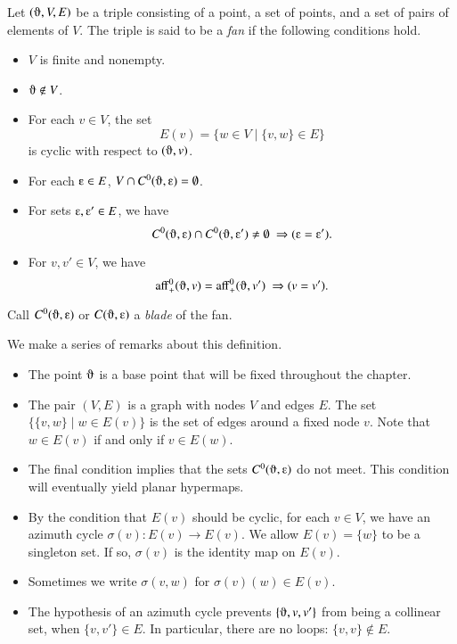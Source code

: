 \begin{definition}[fan]  Let $(\orgn,V,E)$ be a triple consisting of a point,
a set of
points, and a set of pairs of elements of $V$.  The triple is said to be
a {\it fan\/} if the following conditions hold.
    \begin{itemize}
    \item $V$ is finite and nonempty.
    \item $\orgn\not\in V$.
    \item For each $v\in V$, the set
        $$
        E(v) = \{w\in V\mid \{v,w\}\in E\}
        $$
        is cyclic with respect to $(\orgn,v)$.
    \item For each $\e\in E$, $V\cap C^0(\orgn,\e)=\emptyset$.
    \item For sets $\e,\e'\in E$,   we have
        $$C^0(\orgn,\e) \cap C^0(\orgn,\e')\ne\emptyset\ \Rightarrow (\e = \e').$$
    \item For $v,v'\in V$, we have
      $$\op{aff}^0_+(\orgn,v) = \op{aff}^0_+(\orgn,v')\ \Rightarrow (v=v').$$
    \end{itemize}
Call $C^0(\orgn,\e)$ or $C(\orgn,\e)$ a {\it blade\/} of the fan.
\end{definition}

We make a series of remarks about this definition.

\begin{remark}
\begin{itemize}
\item The point $\orgn$ is a base point that will be fixed throughout
the chapter.  
\item The pair $(V,E)$ is a graph with nodes $V$ and edges $E$.  The set
$\{\{v,w\}\mid w\in E(v)\}$ is the set of edges around a fixed node $v$.
Note that $w\in E(v)$ if and only if $v\in E(w)$.   
%
\item The final condition implies that the sets $C^0(\orgn,\e)$
do not meet.   This condition will eventually yield planar
hypermaps.
%
\item
By the condition that $E(v)$ should be cyclic,
for each $v\in V$, we have an azimuth cycle $\sigma(v):E(v)\to E(v)$.
We allow $E(v) = \{w\}$ to be a
singleton set. If so,
$\sigma(v)$ is the identity map on $E(v)$.
%
\item
Sometimes we write $\sigma(v,w)$ for $\sigma(v)(w)\in E(v)$.
%
\item 
The hypothesis of an azimuth cycle
prevents $\{\orgn,v,v'\}$ from being a collinear set, when $\{v,v'\}\in
E$.  In particular, there are no loops: $\{v,v\}\not\in E$.
%
\end{itemize}
\end{remark}





